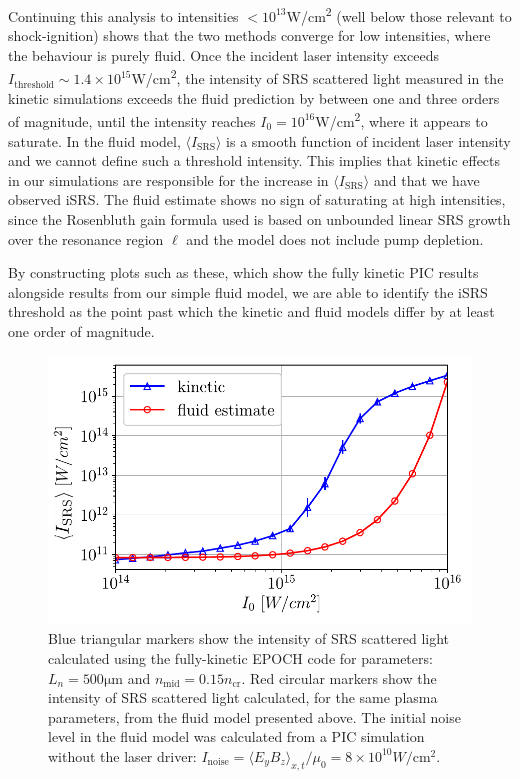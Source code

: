 Continuing this analysis to intensities $<10^{13}$\si{W/\centi\metre^2} (well below those relevant to shock-ignition) shows that the two methods converge for low intensities, where the behaviour is purely fluid. Once the incident laser intensity exceeds  $I_\mathrm{threshold} \sim 1.4\times10^{15}$\si{W/\centi\metre^2}, the intensity of SRS scattered light measured in the kinetic simulations exceeds the fluid prediction by between one and three orders of magnitude, until the intensity reaches $I_0 = 10^{16}$\si{W/\centi\metre^2}, where it appears to saturate. In the fluid model, $\langle I_{\mathrm{SRS}}\rangle$ is a smooth function of incident laser intensity and we cannot define such a threshold intensity. This implies that kinetic effects in our simulations are responsible for the increase in $\langle I_{\mathrm{SRS}} \rangle$ and that we have observed iSRS. The fluid estimate shows no sign of saturating at high intensities, since the Rosenbluth gain formula used is based on unbounded linear SRS growth over the resonance region $\ell$ and the model does not include pump depletion.

By constructing plots such as these, which show the fully kinetic PIC results alongside results from our simple fluid model, we are able to identify the iSRS threshold as the point past which the kinetic and fluid models differ by at least one order of magnitude.


\begin{figure}[ht]
    \centering
    \includegraphics[width=0.8\columnwidth]{Chapters/C4_iSRS/fig2.pdf}
    \caption{
        Blue triangular markers show the intensity of SRS scattered light calculated using the fully-kinetic EPOCH code for parameters: $L_n = 500 \si{\micro\metre} $ and $n_{\mathrm{mid}} = 0.15n_\mathrm{cr}$.
        Red circular markers show the intensity of SRS scattered light calculated, for the same plasma parameters, from the fluid model presented above.
        The initial noise level in the fluid model was calculated from a PIC simulation without the laser driver: $I_\mathrm{noise}=\langle E_yB_z\rangle_{x,t} / \mu_0 = 8\times 10^{10} \si{W/\centi\metre^2}$.}
    \label{fig:kineticVsfluid}
\end{figure}{}

